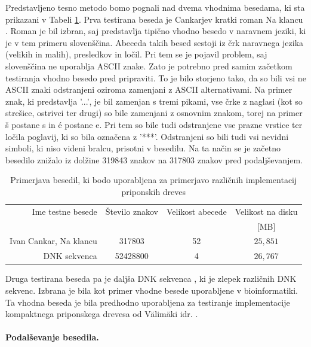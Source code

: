Predstavljeno tesno metodo bomo pognali nad dvema vhodnima besedama, ki sta prikazani v Tabeli \ref{tab:besedila}. Prva testirana beseda je Cankarjev kratki roman Na klancu \cite{podatkiNaKlancu}. Roman je bil izbran, saj predstavlja tipično vhodno besedo v naravnem jeziki, ki je v tem primeru slovenščina. Abeceda takih besed sestoji iz črk naravnega jezika (velikih in malih), presledkov in ločil. Pri tem se je pojavil problem, saj slovenščina ne uporablja ASCII znake. Zato je potrebno pred samim začetkom testiranja vhodno besedo pred pripraviti. To je bilo storjeno tako, da so bili vsi ne ASCII znaki odstranjeni oziroma zamenjani z ASCII alternativami. Na primer znak, ki predstavlja '...', je bil zamenjan s tremi pikami, vse črke z naglasi (kot so strešice, ostrivci ter drugi) so bile zamenjani z osnovnim znakom, torej na primer š postane s in é postane e. Pri tem so bile tudi odstranjene vse prazne vrstice ter ločila poglavij, ki so bila označena z '***'. Odstranjeni so bili tudi vsi nevidni simboli, ki niso videni bralcu, prisotni v besedilu. Na ta način se je začetno besedilo znižalo iz dolžine 319843 znakov na 317803 znakov pred podaljševanjem.

\begin{table}[htb]
    \caption{Primerjava besedil, ki bodo uporabljena za primerjavo različnih implementacij priponskih dreves}
    \label{tab:besedila}
    \centering
    \begin{tabular}{rccc}
        Ime testne besede& Število znakov & Velikost abecede & Velikost na disku \\
        &  &   & [MB]\\
         \hline
        Ivan Cankar, Na klancu \cite{podatkiNaKlancu}& 317803 & 52 & $25,851$ \\
        DNK sekvenca \cite{podatki}&  52428800& 4 & $26,767$ \\
    \end{tabular}    
\end{table}

Druga testirana beseda pa je daljša DNK sekvenca \cite{podatki}, ki je zlepek različnih DNK sekvenc. Izbrana je bila kot primer vhodne besede uporabljene v bioinformatiki. Ta vhodna beseda je bila predhodno uporabljena za testiranje implementacije kompaktnega priponskega drevesa od Välimäki idr. \cite{Valimaki2007}.

\paragraph{Podalševanje besedila.}


